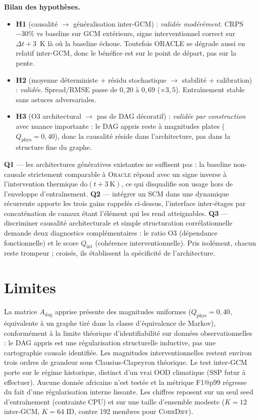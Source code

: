 \documentclass[14pt,a4paper,openany]{extreport}
\theoremstyle{definition}
\newcommand{\Oracle}{\textsc{Oracle}}
\newcommand{\CorrDiff}{\textsc{CorrDiff}}
\newcommand{\Adag}{\ensuremath{A_{\mathrm{dag}}}}
\begin{document}
\textbf{Bilan des hypothèses.}
\begin{itemize}
\item \textbf{H1} (causalité $\to$ généralisation inter-GCM) : \emph{validée modérément}. CRPS $-30\%$ vs baseline sur GCM extérieurs, signe interventionnel correct sur $\Delta t+3$~K là où la baseline échoue. Toutefois ORACLE se dégrade aussi en relatif inter-GCM, donc le bénéfice est sur le point de départ, pas sur la pente.
\item \textbf{H2} (moyenne déterministe + résidu stochastique $\to$ stabilité + calibration) : \emph{validée}. Spread/RMSE passe de $0{,}20$ à $0{,}69$ ($\times 3{,}5$). Entraînement stable sans astuces adversariales.
\item \textbf{H3} (O3 architectural $\to$ pas de DAG décoratif) : \emph{validée par construction} avec nuance importante : le DAG appris reste à magnitudes plates ($Q_{\mathrm{phys}}=0{,}40$), donc la causalité réside dans l'architecture, pas dans la structure fine du graphe.
\end{itemize}

\textbf{Q1} --- les architectures génératives existantes ne suffisent pas : la baseline non-causale strictement comparable à \Oracle{} répond avec un signe inverse à l'intervention thermique $\mathrm{do}(t +3~\mathrm{K})$, ce qui disqualifie son usage hors de l'enveloppe d'entraînement. \textbf{Q2} --- intégrer un SCM dans une dynamique récurrente apporte les trois gains rappelés ci-dessus, l'interface inter-étages par concaténation de canaux étant l'élément qui les rend atteignables. \textbf{Q3} --- discriminer causalité architecturale et simple structuration corrélationnelle demande deux diagnostics complémentaires : le ratio O3 (dépendance fonctionnelle) et le score $Q_{\mathrm{int}}$ (cohérence interventionnelle). Pris isolément, chacun reste trompeur ; croisés, ils établissent la spécificité de l'architecture.

\section*{Limites}

La matrice $\Adag$ apprise présente des magnitudes uniformes ($Q_{\mathrm{phys}} = 0{,}40$, équivalente à un graphe tiré dans la classe d'équivalence de Markov), conformément à la limite théorique d'identifiabilité sur données observationnelles~\cite{pearl_causality_2009} : le DAG appris est une régularisation structurelle inductive, pas une cartographie causale identifiée. Les magnitudes interventionnelles restent environ trois ordres de grandeur sous Clausius-Clapeyron théorique. Le test inter-GCM porte sur le régime historique, distinct d'un vrai OOD climatique (SSP futur à effectuer). Aucune donnée africaine n'est testée et la métrique F1@p99 régresse du fait d'une régularisation interne lissante. Les chiffres reposent sur un seul seed d'entraînement (contrainte CPU) et sur une taille d'ensemble modeste ($K=12$ inter-GCM, $K=64$ ID, contre 192 membres pour \CorrDiff{}).
\end{document}
